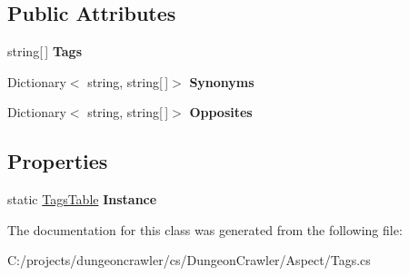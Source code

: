 \subsection*{Public Attributes}
\begin{DoxyCompactItemize}
\item 
\hypertarget{class_dungeon_crawler_1_1_aspect_1_1_tags_table_a402d4a893b96a9e2f9016c61a17aed90}{}string\mbox{[}$\,$\mbox{]} {\bfseries Tags}\label{class_dungeon_crawler_1_1_aspect_1_1_tags_table_a402d4a893b96a9e2f9016c61a17aed90}

\item 
\hypertarget{class_dungeon_crawler_1_1_aspect_1_1_tags_table_a7a1422f50f144503bb751d21addf5e7d}{}Dictionary$<$ string, string\mbox{[}$\,$\mbox{]}$>$ {\bfseries Synonyms}\label{class_dungeon_crawler_1_1_aspect_1_1_tags_table_a7a1422f50f144503bb751d21addf5e7d}

\item 
\hypertarget{class_dungeon_crawler_1_1_aspect_1_1_tags_table_ac880217a128cd20f75ceb362174ca8ef}{}Dictionary$<$ string, string\mbox{[}$\,$\mbox{]}$>$ {\bfseries Opposites}\label{class_dungeon_crawler_1_1_aspect_1_1_tags_table_ac880217a128cd20f75ceb362174ca8ef}

\end{DoxyCompactItemize}
\subsection*{Properties}
\begin{DoxyCompactItemize}
\item 
\hypertarget{class_dungeon_crawler_1_1_aspect_1_1_tags_table_a90b70557bb6a26f7e61d96944a718958}{}static \hyperlink{class_dungeon_crawler_1_1_aspect_1_1_tags_table}{Tags\+Table} {\bfseries Instance}\label{class_dungeon_crawler_1_1_aspect_1_1_tags_table_a90b70557bb6a26f7e61d96944a718958}

\end{DoxyCompactItemize}


The documentation for this class was generated from the following file\+:\begin{DoxyCompactItemize}
\item 
C\+:/projects/dungeoncrawler/cs/\+Dungeon\+Crawler/\+Aspect/Tags.\+cs\end{DoxyCompactItemize}
